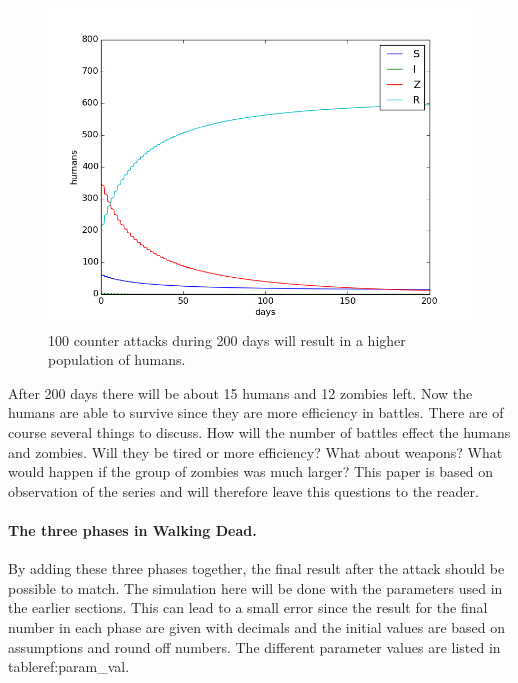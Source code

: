 \documentclass[%
twoside,                 %
final,                   %
10pt]{article}
\begin{document}
\begin{figure}[ht]
  \centerline{\includegraphics[width=0.9\linewidth]{plots/WD_zombie_counter_series.png}}
  \caption{
  \label{fig:counter_series} 100 counter attacks during 200 days will result in a higher population of humans.
  }
\end{figure}


After 200 days there will be about 15 humans and 12 zombies left. Now the humans are able to survive since they are more efficiency in battles. There are of course several things to discuss. How will the number of battles effect the humans and zombies. Will they be tired or more efficiency? What about weapons? What would happen if the group of zombies was much larger? This paper is based on observation of the series and will therefore leave this questions to the reader. 

\paragraph{The three phases in Walking Dead.}
By adding these three phases together, the final result after the attack should be possible to match. The simulation here will be done with the parameters used in the earlier sections. This can lead to a small error since the result for the final number in each phase are given with decimals and the initial values are based on assumptions and round off numbers. The different parameter values are listed in table{ref:param_val}. 
\end{document}
